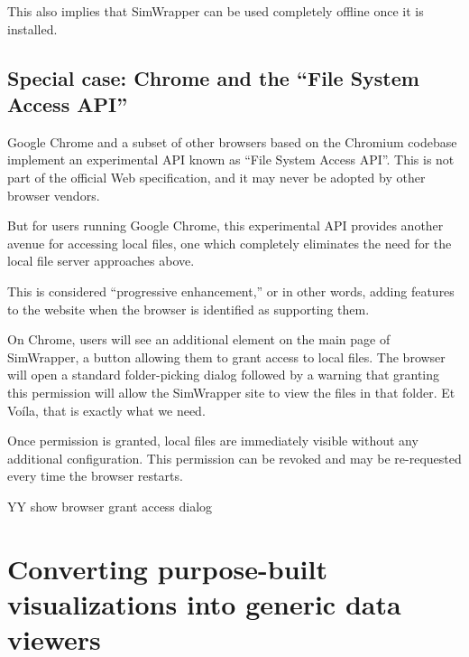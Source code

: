 This also implies that SimWrapper can be used completely offline once it
is installed.


\hypertarget{special-case-chrome-and-the-file-system-access-api}{%
\subsection{Special case: Chrome and the ``File System Access
API''}\label{special-case-chrome-and-the-file-system-access-api}}

Google Chrome and a subset of other browsers based on the Chromium
codebase implement an experimental API known as ``File System Access
API''. This is not part of the official Web specification, and it may
never be adopted by other browser vendors.

But for users running Google Chrome, this experimental API provides
another avenue for accessing local files, one which completely
eliminates the need for the local file server approaches above.

This is considered ``progressive enhancement,'' or in other words,
adding features to the website when the browser is identified as
supporting them.

On Chrome, users will see an additional element on the main page of
SimWrapper, a button allowing them to grant access to local files. The
browser will open a standard folder-picking dialog followed by a warning
that granting this permission will allow the SimWrapper site to view the
files in that folder. Et Voíla, that is exactly what we need.

Once permission is granted, local files are immediately visible without
any additional configuration. This permission can be revoked and may be
re-requested every time the browser restarts.

YY show browser grant access dialog


\hypertarget{converting-purpose-built-visualizations-into-generic-data-viewers}{%
\section{Converting purpose-built visualizations into generic data
viewers}\label{converting-purpose-built-visualizations-into-generic-data-viewers}}

